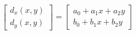 \begin{equation}
    \label{eq:affine-model-representation}
    \begin{bmatrix}
        d_x(x,y) \\ d_y(x,y)
    \end{bmatrix}
    =
    \begin{bmatrix}
        a_0 + a_1 x + a_2 y \\
        b_0 + b_1 x + b_2 y
    \end{bmatrix}
\end{equation}